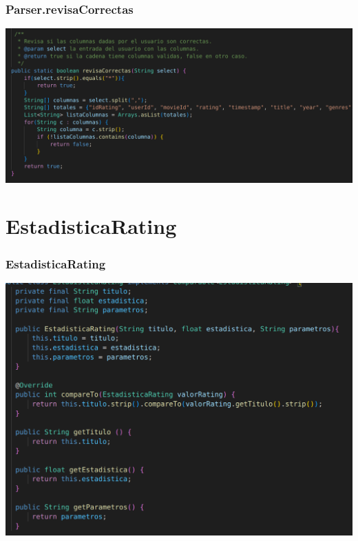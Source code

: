 \documentclass{beamer}
\begin{document}
\begin{frame}
\frametitle{Parser.revisaCorrectas}
\includegraphics[width=\linewidth]{parser_revisacorrectas}
\end{frame}

\section{EstadisticaRating}

\begin{frame}
\frametitle{EstadisticaRating}
\includegraphics[width=\linewidth]{estadisticarating}
\end{frame}
\end{document}
